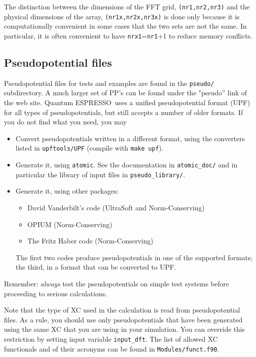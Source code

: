 \documentclass[12pt,a4paper]{article}
\def\qe{{\sc Quantum ESPRESSO}}
\begin{document}
The distinction between the dimensions of the FFT grid,
\texttt{(nr1,nr2,nr3)} and the physical dimensions of the array,
\texttt{(nr1x,nr2x,nr3x)} is done only because it is computationally
convenient in some cases that the two sets are not the same.
In particular, it is often convenient to have \texttt{nrx1}=\texttt{nr1}+1
to reduce memory conflicts.

\subsection{Pseudopotential files}
\label{SubSec:pseudo}
Pseudopotential files for tests and examples are found in the 
\texttt{pseudo/}
subdirectory. A much larger set of PP's can be found under
the "pseudo'' link of the web site. \qe\ uses a unified 
pseudopotential format (UPF) for all types of pseudopotentials, 
but still accepts a number of older formats. If you do not find 
what you need, you may
\begin{itemize}
\item Convert pseudopotentials written in a different format, 
using the converters listed in \texttt{upftools/UPF} (compile with 
\texttt{make upf}).
\item Generate it, using \texttt{atomic}. See the documentation in
\texttt{atomic\_doc/} and in particular the library of input files
in \texttt{pseudo\_library/}.
\item Generate it, using other packages:
\begin{itemize}
\item David Vanderbilt's code (UltraSoft and Norm-Conserving)
\item OPIUM (Norm-Conserving)
\item The Fritz Haber code (Norm-Conserving)
\end{itemize}
The first two codes produce pseudopotentials in one of the 
supported formats; the third, in a format that can be converted 
to UPF.
\end{itemize}
Remember: {\em always} test the pseudopotentials on simple test
systems before proceeding to serious calculations. 

Note that the type of XC used in the calculation is read from 
pseudopotential files. As a rule, you should use only 
pseudopotentials that have been generated using the same 
XC that you are using in your simulation. You can override
this restriction by setting input variable \texttt{input\_dft}. The list of
allowed XC functionals and of their acronyms can be found in 
\texttt{Modules/funct.f90}.
\end{document}
